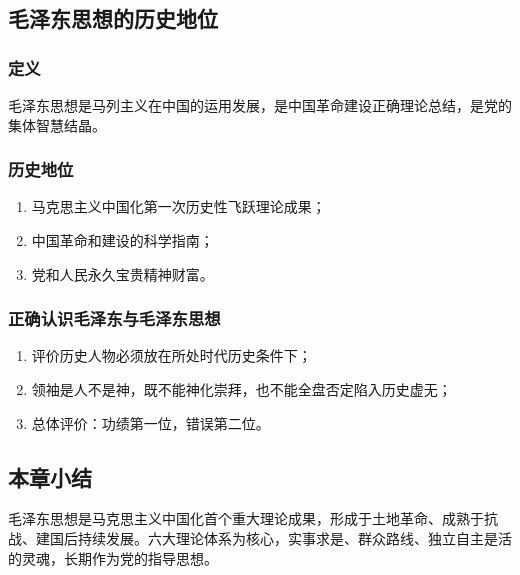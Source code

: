 \subsection{毛泽东思想的历史地位}
\subsubsection{定义}
毛泽东思想是马列主义在中国的运用发展，是中国革命建设正确理论总结，是党的集体智慧结晶。

\subsubsection{历史地位}
\begin{enumerate}
    \item 马克思主义中国化第一次历史性飞跃理论成果；
    \item 中国革命和建设的科学指南；
    \item 党和人民永久宝贵精神财富。
\end{enumerate}

\subsubsection{正确认识毛泽东与毛泽东思想}
\begin{enumerate}
    \item 评价历史人物必须放在所处时代历史条件下；
    \item 领袖是人不是神，既不能神化崇拜，也不能全盘否定陷入历史虚无；
    \item 总体评价：功绩第一位，错误第二位。
\end{enumerate}

\subsection{本章小结}
毛泽东思想是马克思主义中国化首个重大理论成果，形成于土地革命、成熟于抗战、建国后持续发展。六大理论体系为核心，实事求是、群众路线、独立自主是活的灵魂，长期作为党的指导思想。
